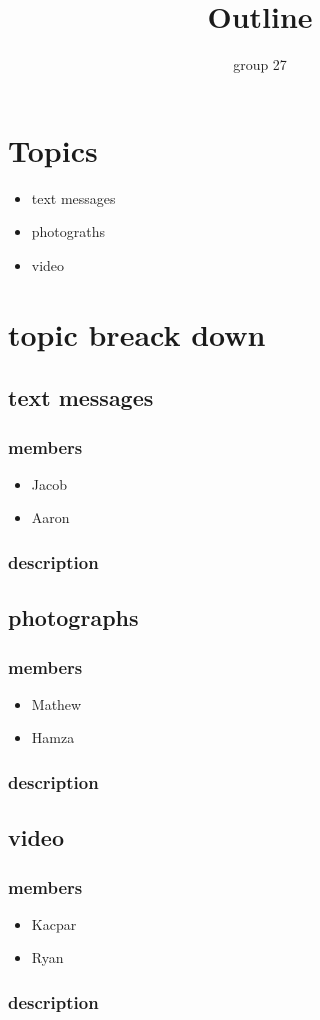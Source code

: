 \documentclass{article}
\begin{document}
\title{Outline}
\author{group 27}

\maketitle

\section{Topics}
\begin{itemize}
    \item text messages
    \item photograths
    \item video
\end{itemize}


\section{topic breack down}
\subsection{text messages} 
\subsubsection{members}
\begin{itemize}
    \item Jacob
    \item Aaron
\end{itemize}
\subsubsection{description}

\subsection{photographs}
\subsubsection{members}
\begin{itemize}
    \item Mathew
    \item Hamza
\end{itemize}
\subsubsection{description}

\subsection{video}
\subsubsection{members}
\begin{itemize}
    \item Kacpar
    \item Ryan
\end{itemize}
\subsubsection{description}
\end{document}
